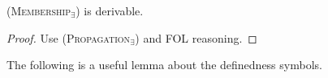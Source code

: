 \documentclass[acmsmall]{acmart}
\theoremstyle{acmdefinition}
\newcommand{\imp}{\to}
\newcommand{\prule}[1]{\textsc{(#1)}}
\newcommand{\modusponens}{\prule{Modus Ponens}\xspace}
\newcommand{\universalgeneralization}{\prule{Universal Generalization}\xspace}
\newcommand{\existence}{\prule{Existence}\xspace}
\newcommand{\singletonvariable}{\prule{Singleton Variable}\xspace}
\newcommand{\propagationexists}{\prule{Propagation$_\exists$}\xspace}
\newcommand{\framing}{\prule{Framing}\xspace}
\newcommand{\membershipexists}{\prule{Membership$_\exists$}\xspace}
\DeclarePairedDelimiter{\ceil}{\lceil}{\rceil}
\newcommand{\Prop}[1]{Proposition~\ref{#1}}
\begin{document}
\begin{lemma}
	\membershipexists is derivable.
\end{lemma}
\begin{proof}
	Use \propagationexists and FOL reasoning.
\end{proof}

\begin{comment}
\begin{lemma}
\label{lemma_P_implies_ceil_P}
$\varphi \imp \ceil{\varphi}$ is derivable.
\end{lemma}
\begin{proof}
Let $x$ be a variable that does not occur free in $\varphi$.
\begin{center}
\begin{tabular}{l|ll}
	1 & $\ceil{x}$ & definedness axiom \\
	2 & $x \imp (x \wedge \neg \varphi) \vee \varphi$
	  & propositional tautology \\
	3 & $\ceil{x} \imp \ceil{(x \wedge \neg \varphi) \vee \varphi}$
	  & by 2, \framing \\
	4 & $\ceil{(x \wedge \neg \varphi) \vee \varphi}$
	  & by 1 and 3, \modusponens \\
	5 & $\ceil{x \wedge \neg \varphi} \vee \ceil{\varphi}$
	  & by 4, \Prop{prop_propgation_of_symbol_application} \\
	6 & $\neg \ceil{x \wedge \neg \varphi} \imp \ceil{\varphi}$
	  & by 5, FOL reasoning \\
	7 & $(x \wedge \varphi) \imp \neg \ceil{x \wedge \neg \varphi}$
	  & by \singletonvariable and FOL reasoning \\
	8 & $x \wedge \varphi \imp \ceil{\varphi}$
	  & by 7 and 6, FOL reasoning \\
	9 & $x \imp (\varphi \imp \ceil{\varphi})$
	  & by 8, FOL reasoning \\
	10& $\forall x . (x \imp (\varphi \imp \ceil{\varphi}))$
	  & by 9, \universalgeneralization \\
	11& $(\exists x . x) \imp (\varphi \imp \ceil{\varphi})$
	  & by 10, FOL reasoning \\
	12& $\exists x . x$
	  & by \existence \\
	13& $\varphi \imp \ceil{\varphi}$
	  & by 12 and 11, \modusponens
\end{tabular}
\end{center}
\end{proof}
\end{comment}

The following is a useful lemma about the definedness symbols.
\end{document}
